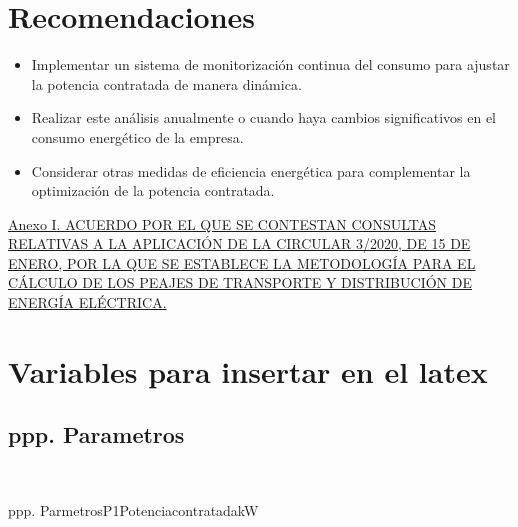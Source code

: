 \documentclass[a4paper,10pt]{article}
\begin{document}
\begin{Form}
\section{Recomendaciones}
\begin{itemize}
    \item Implementar un sistema de monitorización continua del consumo para ajustar la potencia contratada de manera dinámica.
    \item Realizar este análisis anualmente o cuando haya cambios significativos en el consumo energético de la empresa.
    \item Considerar otras medidas de eficiencia energética para complementar la optimización de la potencia contratada.
\end{itemize}
















\begin{thebibliography}{99}


\href{}
{}


\href{https://www.cnmc.es/sites/default/files/3416756_135.pdf}
{Anexo I. ACUERDO POR EL QUE SE CONTESTAN CONSULTAS RELATIVAS A LA
APLICACIÓN DE LA CIRCULAR 3/2020, DE 15 DE ENERO, POR LA QUE SE
ESTABLECE LA METODOLOGÍA PARA EL CÁLCULO DE LOS PEAJES DE
TRANSPORTE Y DISTRIBUCIÓN DE ENERGÍA ELÉCTRICA.}




\end{thebibliography}








\ifdefined\MostrarVariablesAlFinal
\newpage
\onecolumn


\newpage 
\section{Variables para insertar en el latex}
\newpage 
\subsection{ppp. Parametros}\

ppp. ParmetrosP1PotenciacontratadakW


\end{Form}
\end{document}

